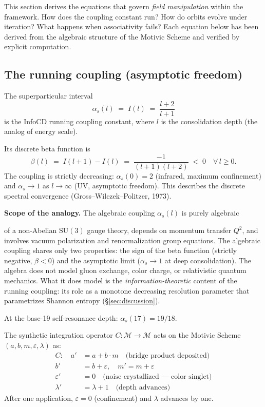 \documentclass[12pt,oneside]{article}
\theoremstyle{principia}
\theoremstyle{definition}
\theoremstyle{remark}
\begin{document}
This section derives the equations that govern \emph{field manipulation} within the framework. How does the coupling constant run? How do orbits evolve under iteration? What happens when associativity fails? Each equation below has been derived from the algebraic structure of the Motivic Scheme and verified by explicit computation.

\subsection{The running coupling (asymptotic freedom)}

The superparticular interval
\[
\alpha_s(l) \;=\; I(l) \;=\; \frac{l + 2}{l + 1}
\]
is the InfoCD running coupling constant, where $l$ is the
consolidation depth (the analog of energy scale).

Its discrete beta function is
\[
\beta(l) \;=\; I(l+1) - I(l) \;=\; \frac{-1}{(l+1)(l+2)} \;<\; 0
\quad \forall\, l \geq 0.
\]
The coupling is strictly decreasing: $\alpha_s(0) = 2$ (infrared,
maximum confinement) and $\alpha_s \to 1$ as $l \to \infty$ (UV,
asymptotic freedom). This describes the discrete spectral convergence
(Gross--Wilczek--Politzer, 1973).

\textbf{Scope of the analogy.} The algebraic coupling $\alpha_s(l)$
is purely algebraic

of a non-Abelian $\mathrm{SU}(3)$ gauge theory, depends on momentum
transfer $Q^2$, and involves vacuum polarization and renormalization
group equations. The algebraic coupling shares only two properties:
the sign of the beta function (strictly negative, $\beta < 0$) and
the asymptotic limit ($\alpha_s \to 1$ at deep consolidation). The
algebra does not model gluon exchange, color charge, or relativistic
quantum mechanics. What it does model is the \emph{information-theoretic}
content of the running coupling: its role as a monotone decreasing
resolution parameter that parametrizes Shannon entropy
(\S\ref{sec:discussion}).

At the base-19 self-resonance depth: $\alpha_s(17) = 19/18$.

The synthetic integration operator $C : \mathcal{M} \to \mathcal{M}$
acts on the Motivic Scheme $(a, b, m, \varepsilon, \lambda)$ as:
\begin{align}
C: \quad
a' &= a + b \cdot m \quad \text{(bridge product deposited)} \\
b' &= b + \varepsilon, \quad m' = m + \varepsilon \\
\varepsilon' &= 0 \quad \text{(noise crystallized --- color singlet)} \\
\lambda' &= \lambda + 1 \quad \text{(depth advances)}
\end{align}
After one application, $\varepsilon = 0$ (confinement) and
$\lambda$ advances by one.
\end{document}
